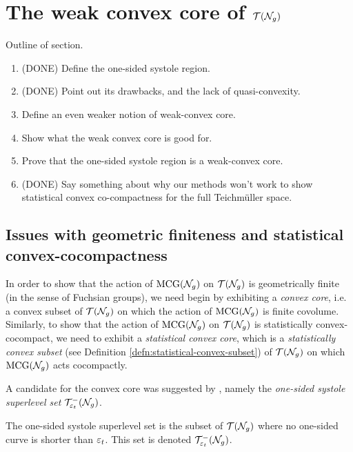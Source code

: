 \documentclass[12pt, reqno]{amsart}
\begin{document}
\section{The weak convex core of $\mathcal{T}(\mathcal{N}_g)$}
\label{sec:weak-convex-core}

Outline of section.
\begin{enumerate}[(1)]
\item (DONE) Define the one-sided systole region.
\item (DONE) Point out its drawbacks, and the lack of quasi-convexity.
\item Define an even weaker notion of weak-convex core.
\item Show what the weak convex core is good for.
\item Prove that the one-sided systole region is a weak-convex core.
\item (DONE) Say something about why our methods won't work to show statistical convex co-compactness for the full Teichmüller space.
\end{enumerate}

\subsection{Issues with geometric finiteness and statistical convex-cocompactness}
\label{sec:issu-with-geom}

In order to show that the action of $\mathrm{MCG}(\mathcal{N}_g)$ on $\mathcal{T}(\mathcal{N}_g)$ is geometrically finite (in the sense of Fuchsian groups), we need begin by exhibiting a \emph{convex core}, i.e. a convex subset of $\mathcal{T}(\mathcal{N}_g)$ on which the action of $\mathrm{MCG}(\mathcal{N}_g)$ is finite covolume.
Similarly, to show that the action of $\mathrm{MCG}(\mathcal{N}_g)$ on $\mathcal{T}(\mathcal{N}_g)$ is statistically convex-cocompact, we need to exhibit a \emph{statistical convex core}, which is a \emph{statistically convex subset} (see Definition \ref{defn:statistical-convex-subset}) of $\mathcal{T}(\mathcal{N}_g)$ on which $\mathrm{MCG}(\mathcal{N}_g)$ acts cocompactly.

A candidate for the convex core was suggested by \textcite{gendulphe2017whats}, namely the \emph{one-sided systole superlevel set} $\mathcal{T}_{\varepsilon_t}^{-}(\mathcal{N}_g)$.

\begin{definition}
  The one-sided systole superlevel set is the subset of $\mathcal{T}(\mathcal{N}_g)$ where no one-sided curve is shorter than $\varepsilon_t$. This set is denoted $\mathcal{T}_{\varepsilon_t}^{-}(\mathcal{N}_g)$.
\end{definition}
\end{document}
